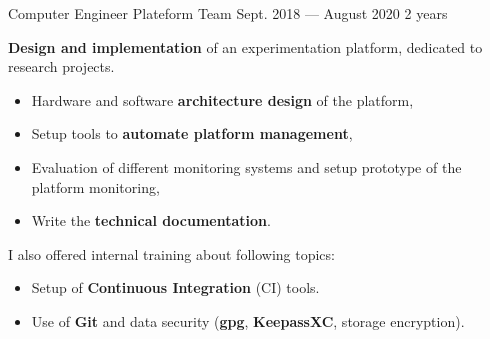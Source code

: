 \jobposition%
{Computer Engineer}%
{Plateform Team}
{Sept. 2018 --- August 2020}%
{2 years}%
{
	\textbf{Design and implementation} of an experimentation platform, dedicated
	to research projects.
	\vspace{0.5em}
	\begin{itemize}
		\item Hardware and software \textbf{architecture design} of the
		      platform,
		\item Setup tools to \textbf{automate platform management},
		\item Evaluation of different monitoring systems and setup
		      prototype of the platform monitoring,
		\item Write the \textbf{technical documentation}.
	\end{itemize}
	\vspace{0.5em}
	I also offered internal training about following topics:
	\vspace{0.5em}
	\begin{itemize}
		\item Setup of \textbf{Continuous Integration} (CI) tools.
		\item Use of \textbf{Git} and data security (\textbf{gpg},
		      \textbf{KeepassXC}, storage encryption).
	\end{itemize}
	\vspace{1em}

}
